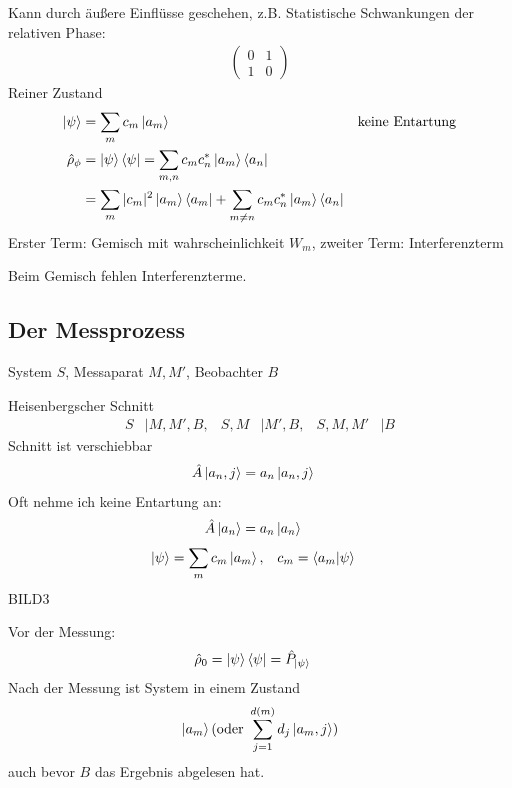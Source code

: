 	Kann durch äußere Einflüsse geschehen, z.B. Statistische Schwankungen der relativen Phase:
		\begin{align*}
			\begin{pmatrix}
				0 & 1 \\
				1 & 0 
			\end{pmatrix} 
		\end{align*}
	Reiner Zustand
		\begin{align*}
			\ket{\psi} &= \sum_m c_m \ket{a_m} & &\text{keine Entartung}\\
			\hat{\rho}_\phi &= \ket{\psi} \bra{\psi} = 
			\sum_{m, n} c_m c_n^* \ket{a_m} \bra{a_n} \\
			&= \sum_m |c_m|^2 \ket{a_m} \bra{a_m} + \sum_{m \neq n} c_m c_n^* \ket{a_m} \bra{a_n}
		\end{align*}
	Erster Term: Gemisch mit wahrscheinlichkeit $W_m$, zweiter Term: Interferenzterm
	
	Beim Gemisch fehlen Interferenzterme.
\subsection{Der Messprozess}
	System $S$, Messaparat $M, M'$, Beobachter $B$
	
	Heisenbergscher Schnitt
		\begin{align*}
			S &| M, M', B,& S,M &| M', B,& S, M, M' &| B 
		\end{align*}
	Schnitt ist verschiebbar
		\begin{align*}
			\hat{A} \ket{a_n, j} &= a_n \ket{a_n, j}
		\end{align*}
	Oft nehme ich keine Entartung an: 
		\begin{align*}
		\hat{A} \ket{a_n} &= a_n \ket{a_n}
		\end{align*}
		\begin{align*}
			\ket{\psi} &= \sum_m c_m \ket{a_m}, & c_m &= \braket{a_m | \psi}
		\end{align*}
	BILD3
	
	Vor der Messung: 
		\begin{align*}
			\hat{\rho}_0 &= \ket{\psi} \bra{\psi} = \hat{P}_{\ket{\psi}}
		\end{align*}
	Nach der Messung ist System in einem Zustand
		\begin{align*}
			\ket{a_m} (\text{oder } \sum_{j = 1}^{d(m)} d_j \ket{a_m, j})
		\end{align*}
	auch bevor $B$ das Ergebnis abgelesen hat.
	
